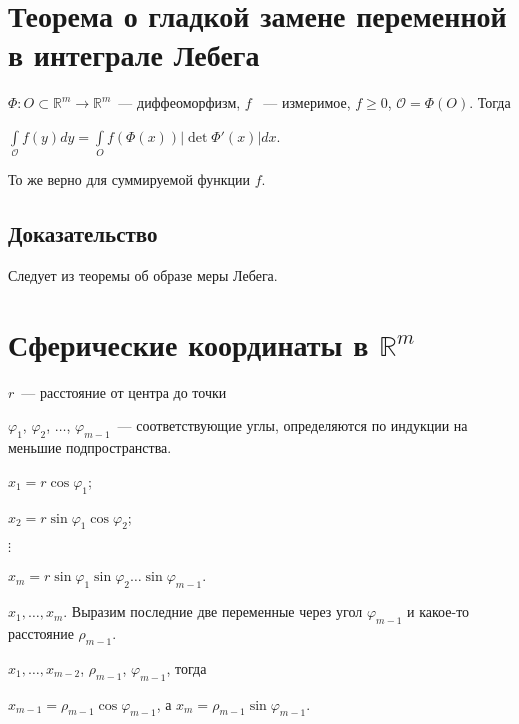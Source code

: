 \documentclass{article}
\begin{document}
    \newpage
    
    \section{Теорема о гладкой замене переменной в интеграле Лебега}
    
        $\Phi: O \subset \mathbb{R}^m \rightarrow \mathbb{R}^m$~--- диффеоморфизм, $f$ ~--- измеримое, $f \geqslant 0$, $\mathcal{O} = \Phi \left( O \right)$. Тогда
            
        $\int\limits_{\mathcal{O}} f(y) dy = \int\limits_O f \left(\Phi(x)\right) \left| \det \Phi'(x) \right| dx$.
            
        То же верно для суммируемой функции $f$.
        
        \subsection{Доказательство}
        
            Следует из теоремы об образе меры Лебега.
        
    \newpage
    
    \section{Сферические координаты в $\mathbb{R}^m$}
    
        $r$~--- расстояние от центра до точки
                    
        $\varphi_1$, $\varphi_2$, $\ldots$, $\varphi_{m - 1}$~--- соответствующие углы, определяются по индукции на меньшие подпространства.
                    
        $x_1 = r \cos \varphi_1$;
                    
        $x_2 = r \sin \varphi_1 \cos \varphi_2$;
                    
        $\vdots$
                    
        $x_m = r \sin \varphi_1 \sin \varphi_2 \ldots \sin \varphi_{m - 1}$.
                    
        $x_1, \ldots, x_m$. Выразим последние две переменные через угол $\varphi_{m - 1}$ и какое-то расстояние $\rho_{m - 1}$.
                    
        $x_1, \ldots, x_{m - 2}$, $\rho_{m - 1}$, $\varphi_{m - 1}$, тогда
                    
        $x_{m - 1} = \rho_{m - 1} \cos \varphi_{m - 1}$, а $x_m = \rho_{m - 1} \sin \varphi_{m - 1}$.
    
\end{document}
